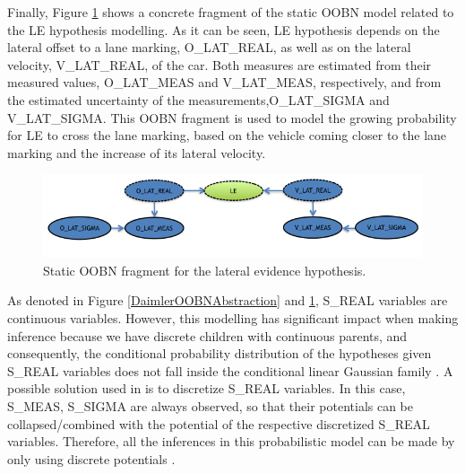 Finally, Figure \ref{Figure:DaimlerLE} shows a concrete fragment of the static OOBN model related to the LE hypothesis modelling. As it can be seen, LE hypothesis depends on the lateral offset to a lane marking, O\_LAT\_REAL, as well as on the lateral velocity, V\_LAT\_REAL, of the car. Both measures are estimated from their measured values, O\_LAT\_MEAS and V\_LAT\_MEAS, respectively, and from the estimated uncertainty of the measurements,O\_LAT\_SIGMA and V\_LAT\_SIGMA. This OOBN fragment is used to model the growing probability for LE to cross the lane marking, based on the vehicle coming closer to the lane marking and the increase of its lateral velocity.

\begin{figure}
\begin{center}
\includegraphics[scale=0.58]{./figures/DaimlerLE}
\caption{\label{Figure:DaimlerLE} Static OOBN fragment for the lateral evidence hypothesis.}
\end{center}
\end{figure}

As denoted in Figure \ref{DaimlerOOBNAbstraction} and \ref{Figure:DaimlerLE}, S\_REAL variables are continuous variables. However, this modelling has significant impact when making inference because we have discrete children with continuous parents, and consequently, the conditional probability distribution of the hypotheses given S\_REAL variables does not fall inside the conditional linear Gaussian family \cite{nielsen2009bayesian}. A possible solution used in \cite{kasper2012object} is to discretize S\_REAL variables. In this case, S\_MEAS, S\_SIGMA are always observed, so that their potentials can be collapsed/combined with the potential of the respective discretized S\_REAL variables. Therefore, all the inferences in this probabilistic model can be made by only using discrete potentials \cite{nielsen2009bayesian}.
